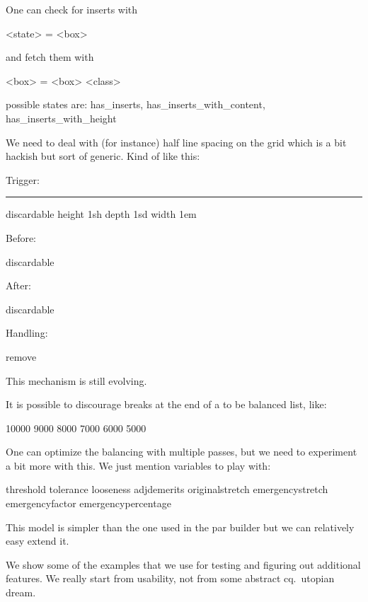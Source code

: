 One can check for inserts with

\starttyping
<state> = \boxinserts <box>
\stoptyping

and fetch them with

\starttyping
<box>   = \vbalancedinsert <box> <class>
\stoptyping

possible states are: has_inserts, has_inserts_with_content, has_inserts_with_height

\stoptitle

\starttitle[title=Activities: discarding]

We need to deal with (for instance) half line spacing on the grid which is a bit
hackish but sort of generic. Kind of like this:

Trigger:

\starttyping
\par \vskip0pt \hrule discardable height 1sh depth 1sd width 1em \par
\stoptyping

Before:

\starttyping
\vskip0pt \vbox discardable {} \par
\stoptyping

After:

\starttyping
\vskip0pt \vbox discardable {}  \par
\stoptyping

Handling:

\starttyping
{}       \relax %
{} remove\relax %
\stoptyping

This mechanism is still evolving.

\stoptitle

\starttitle[title=Activities: penalties]

It is possible to discourage breaks at the end of a to be balanced list, like:

\starttyping
{}
    10000 9000 8000 7000 6000 5000
\relax
\stoptyping

\stoptitle

\starttitle[title=Activities: passes]

One can optimize the balancing with multiple passes, but we need to experiment a
bit more with this. We just mention variables to play with:

\startitem threshold \stopitem
\startitem tolerance \stopitem
\startitem looseness \stopitem
\startitem adjdemerits \stopitem
\startitem originalstretch \stopitem
\startitem emergencystretch \stopitem
\startitem emergencyfactor \stopitem
\startitem emergencypercentage \stopitem
\stopitemize

This model is simpler than the one used in the par builder but we can relatively
easy extend it.

\stoptitle

\starttitle[title=Some examples]

We show some of the examples that we use for testing and figuring out additional
features. We really start from usability, not from some abstract cq.\ utopian
dream.

\stoptitle

\stopdocument
